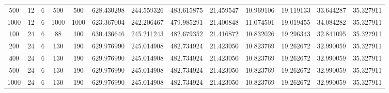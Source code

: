 \begin{table}[h]
\begin{tabular}{ccccccccccccc}
500 & 12 & 6 & 500 & 500 & 628.430298 & 244.559326 & 483.615875 & 21.459547 & 10.969106 & 19.119133 & 33.644287 & 35.327911 \\
1000 & 12 & 6 & 1000 & 1000 & 623.367004 & 242.206467 & 479.985291 & 21.400848 & 11.074501 & 19.019455 & 34.084282 & 35.327911 \\
100 & 24 & 6 & 88 & 100 & 630.436646 & 245.211243 & 482.679352 & 21.416872 & 10.832026 & 19.296343 & 32.841095 & 35.327911 \\
200 & 24 & 6 & 130 & 190 & 629.976990 & 245.014908 & 482.734924 & 21.423050 & 10.823769 & 19.262672 & 32.990059 & 35.327911 \\
400 & 24 & 6 & 130 & 190 & 629.976990 & 245.014908 & 482.734924 & 21.423050 & 10.823769 & 19.262672 & 32.990059 & 35.327911 \\
500 & 24 & 6 & 130 & 190 & 629.976990 & 245.014908 & 482.734924 & 21.423050 & 10.823769 & 19.262672 & 32.990059 & 35.327911 \\
1000 & 24 & 6 & 130 & 190 & 629.976990 & 245.014908 & 482.734924 & 21.423050 & 10.823769 & 19.262672 & 32.990059 & 35.327911 \\
\bottomrule
\end{tabular}
\end{table}
